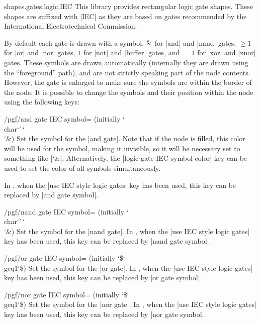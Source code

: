 \begin{pgflibrary}{shapes.gates.logic.IEC}
  This library provides rectangular logic gate shapes. These shapes
  are suffixed with |IEC| as they are based on gates recommended by
  the International Electrotechnical Commission.

  By default each gate is drawn with a symbol, $\char`\&$ for |and| and
  |nand| gates, $\geq1$ for |or| and |nor| gates, $1$ for |not| and
  |buffer| gates, and $=1$ for |xor| and |xnor| gates. These symbols
  are drawn automatically (internally they are drawn using the
  ``foreground'' path), and are not strictly speaking part of the node
  contents. However, the gate is enlarged to make sure the symbols are
  within the border of the node.
  It is possible to change
  the symbols and their position within the node using the following
  keys:

\begin{key}{/pgf/and gate IEC symbol= (initially \char`\\char\char`\`\char`\\\char`\&)}
  Set the symbol for the |and gate|. Note that if the node is filled,
  this color will be used for the symbol, making it invisible, so
  it will be necessary set  to something like
  |\color{black}\char`\&|. Alternatively, the
  |logic gate IEC symbol color| key can be used to set the color
  of all symbols simultaneously.

  In \tikzname, when the |use IEC style logic gates| key has been
  used, this key can be replaced by |and gate symbol|.
\end{key}

\begin{key}{/pgf/nand gate IEC symbol= (initially \char`\\char\char`\`\char`\\\char`\&)}
  Set the symbol for the |nand gate|.
  In \tikzname, when the |use IEC style logic gates| key has been
  used, this key can be replaced by |nand gate symbol|.
\end{key}

\begin{key}{/pgf/or gate IEC symbol= (initially \char`\$\char`\\geq1\char`\$)}
  Set the symbol for the |or gate|.
  In \tikzname, when the |use IEC style logic gates| key has been
  used, this key can be replaced by |or gate symbol|.
\end{key}

\begin{key}{/pgf/nor gate IEC symbol= (initially \char`\$\char`\\geq1\char`\$)}
  Set the symbol for the |nor gate|.
  In \tikzname, when the |use IEC style logic gates| key has been
  used, this key can be replaced by |nor gate symbol|.
\end{key}


\end{pgflibrary}
